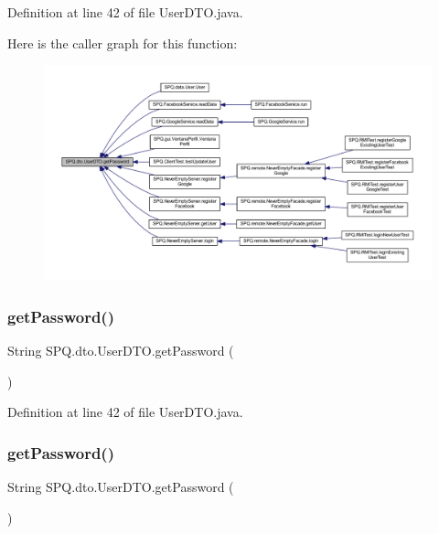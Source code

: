 Definition at line 42 of file User\+D\+T\+O.\+java.

Here is the caller graph for this function\+:
\nopagebreak
\begin{figure}[H]
\begin{center}
\leavevmode
\includegraphics[width=350pt]{class_s_p_q_1_1dto_1_1_user_d_t_o_a955f436e60336683283a6fcd6fc5f874_icgraph}
\end{center}
\end{figure}
\mbox{\label{class_s_p_q_1_1dto_1_1_user_d_t_o_a955f436e60336683283a6fcd6fc5f874}} 
\subsubsection{\texorpdfstring{get\+Password()}{getPassword()}\hspace{0.1cm}{\footnotesize\ttfamily [2/3]}}
{\footnotesize\ttfamily String S\+P\+Q.\+dto.\+User\+D\+T\+O.\+get\+Password (\begin{DoxyParamCaption}{ }\end{DoxyParamCaption})}



Definition at line 42 of file User\+D\+T\+O.\+java.

\mbox{\label{class_s_p_q_1_1dto_1_1_user_d_t_o_a955f436e60336683283a6fcd6fc5f874}} 
\subsubsection{\texorpdfstring{get\+Password()}{getPassword()}\hspace{0.1cm}{\footnotesize\ttfamily [3/3]}}
{\footnotesize\ttfamily String S\+P\+Q.\+dto.\+User\+D\+T\+O.\+get\+Password (\begin{DoxyParamCaption}{ }\end{DoxyParamCaption})}



